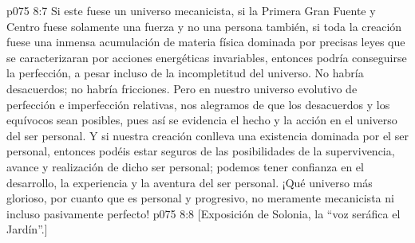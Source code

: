 \vs p075 8:7 Si este fuese un universo mecanicista, si la Primera Gran Fuente y Centro fuese solamente una fuerza y no una persona también, si toda la creación fuese una inmensa acumulación de materia física dominada por precisas leyes que se caracterizaran por acciones energéticas invariables, entonces podría conseguirse la perfección, a pesar incluso de la incompletitud del universo. No habría desacuerdos; no habría fricciones. Pero en nuestro universo evolutivo de perfección e imperfección relativas, nos alegramos de que los desacuerdos y los equívocos sean posibles, pues así se evidencia el hecho y la acción en el universo del ser personal. Y si nuestra creación conlleva una existencia dominada por el ser personal, entonces podéis estar seguros de las posibilidades de la supervivencia, avance y realización de dicho ser personal; podemos tener confianza en el desarrollo, la experiencia y la aventura del ser personal. ¡Qué universo más glorioso, por cuanto que es personal y progresivo, no meramente mecanicista ni incluso pasivamente perfecto!
\vsetoff
\vs p075 8:8 [Exposición de Solonia, la “voz seráfica el Jardín”.]
